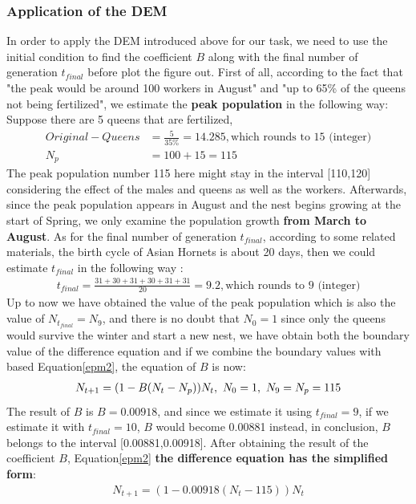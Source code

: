 \documentclass{mcmthesis}
\begin{document}
 	\subsubsection{Application of the DEM}
 	\quad In order to apply the DEM introduced above for our task, we need to use the initial condition to find the coefficient $B$ along with the final number of generation $t_{final}$ before plot the figure out. First of all, according to the fact that "the peak would be around 100 workers in August" and "up to 65\% of the queens not being fertilized", we estimate the \textbf{peak population} in the following way: Suppose there are 5 queens that are fertilized,
 	\begin{align*}
 		Original-Queens &= \frac{5}{35\%} = 14.285, \text{which rounds to 15 (integer)}\\
 		N_p &= 100 + 15 = 115
 	\end{align*}
 	The peak population number 115 here might stay in the interval [110,120] considering the effect of the males and queens as well as the workers. Afterwards, since the peak population appears in August and the nest begins growing at the start of Spring, we only examine the population growth \textbf{from March to August}. As for the final number of generation $t_{final}$, according to some related materials, the birth cycle of Asian Hornets is about 20 days, then we could estimate $t_{final}$ in the following way \cite{intro0}:
 	\begin{align*}
 	 t_{final} = \frac{31+30+31+30+31+31}{20} = 9.2,\text{which rounds to 9 (integer)}
 	\end{align*}
	 Up to now we have obtained the value of the peak population which is also the value of $N_{t_{final}} = N_9 $, and there is no doubt that $N_0 = 1$ since only the queens would survive the winter and start a new nest, we have obtain both the boundary value of the difference equation and if we combine the boundary values with based Equation\ref{epm2}, the equation of $B$ is now:
 	\begin{align*}
 		N_{t+1} = (1-B(N_t-N_p))N_{t},\text{\space} N_0 = 1,\text{\space} N_9 = N_p = 115
 	\end{align*}
 	The result of $B$ is $B = 0.00918$, and since we estimate it using $t_{final} = 9$, if we estimate it with $t_{final} = 10$, $B$ would become 0.00881 instead, in conclusion, $B$ belongs to the interval [0.00881,0.00918]. After obtaining the result of the coefficient $B$, Equation\ref{epm2} \textbf{the difference equation has the simplified form}:
 	\begin{align}
 			N_{t+1} = (1-0.00918(N_t-115))N_{t}
 			\label{eqm3}
 	\end{align}
\end{document}

